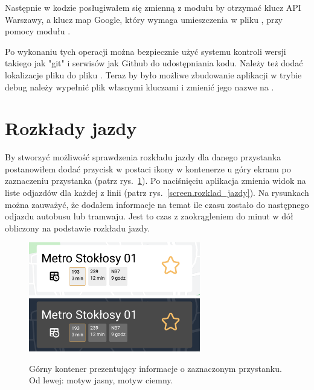 \documentclass{SGGW-thesis}
\begin{document}
Następnie w kodzie posługiwałem się zmienną  z modułu  by otrzymać klucz API Warszawy,
a klucz map Google, który wymaga umieszczenia w pliku , przy pomocy modułu .

Po wykonaniu tych operacji można bezpiecznie użyć systemu kontroli wersji takiego jak "git" i serwisów jak Github do udostępniania kodu.
Należy też dodać lokalizacje pliku  do pliku .
Teraz by było możliwe zbudowanie aplikacji w trybie debug należy wypełnić plik  własnymi kluczami i zmienić jego nazwe na .

\section{Rozkłady jazdy}
By stworzyć możliwość sprawdzenia rozkładu jazdy dla danego przystanka postanowiłem dodać przycisk w postaci ikony w kontenerze u góry ekranu po zaznaczeniu przystanka (patrz rys.~\ref{screen.topbox}).
Po naciśnięciu aplikacja zmienia widok na liste odjazdów dla każdej z linii (patrz rys.~\ref{screen.rozklad_jazdy}).
Na rysunkach można zauważyć, że dodałem informacje na temat ile czasu zostało do następnego odjazdu autobusu lub tramwaju.
Jest to czas z zaokrągleniem do minut w dół obliczony na podstawie rozkładu jazdy.
\begin{figure}[b]
  \centering
  \includegraphics[width=75mm]{screeny/topbox_jasny}
  \enspace
  \includegraphics[width=75mm]{screeny/topbox_ciemny}
  \caption[Górny kontener]{
    \label{screen.topbox}
    Górny kontener prezentujący informacje o zaznaczonym przystanku. Od lewej: motyw jasny, motyw ciemny. \vspace{2ex}
  }
\end{figure}
\end{document}
